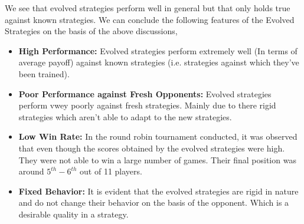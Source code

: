 \documentclass[a4paper]{article}
\begin{document}
	We see that evolved strategies perform well in general but that only holds true against known strategies. We can conclude the following features of the Evolved Strategies on the basis of the above discussions,
	\begin{itemize}
		\item \textbf{High Performance:} Evolved strategies perform extremely well (In terms of average payoff) against known strategies (i.e. strategies against which they've been trained).
		\item \textbf{Poor Performance against Fresh Opponents:} Evolved strategies perform vwey poorly against fresh strategies. Mainly due to there rigid strategies which aren't able to adapt to the new strategies.
		\item \textbf{Low Win Rate:} In the round robin tournament conducted, it was observed that even though the scores obtained by the evolved strategies were high. They were not able to win a large number of games. Their final position was around $5^{th}-6^{th}$ out of 11 players.
		\item \textbf{Fixed Behavior:} It is evident that the evolved strategies are rigid in nature and do not change their behavior on the basis of the opponent. Which is a desirable quality in a strategy.
	\end{itemize}
\end{document}
